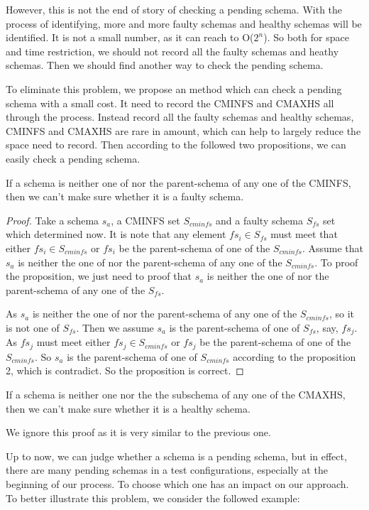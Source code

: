 \documentclass[10pt,journal,cspaper,compsoc]{IEEEtran}
\begin{document}
However, this is not the end of story of checking a pending schema. With the process of identifying, more and more faulty schemas and healthy schemas will be identified. It is not a small number, as it can reach to O($2^n$). So both for space and time restriction, we should not record all the faulty schemas and heathy schemas. Then we should find another way to check the pending schema.

To eliminate this problem, we propose an method which can check a pending schema with a small cost. It need to record the CMINFS and CMAXHS all through the process. Instead record all the faulty schemas and healthy schemas, CMINFS and CMAXHS are rare in amount, which can help to largely reduce the space need to record. Then according to the followed two propositions, we can easily check a pending schema.

\begin{proposition}
If a schema is neither one of nor the parent-schema of any one of the CMINFS, then we can't make sure whether it is a faulty schema.
\end{proposition}
\begin{proof}
Take a schema $s_a$, a CMINFS set $S_{cminfs}$ and a faulty schema $S_{fs}$ set which determined now. It is note that any element $fs_i \in S_{fs}$ must meet that either $fs_i \in S_{cminfs}$ or $fs_i$ be the parent-schema of one of the $S_{cminfs}$. Assume that $s_a$ is neither the one of nor the parent-schema of any one of the $S_{cminfs}$. To proof the proposition, we just need to proof that $s_a$ is neither the one of nor the parent-schema of any one of the $S_{fs}$.

As $s_a$ is neither the one of nor the parent-schema of any one of the $S_{cminfs}$, so it is not one of $S_{fs}$. Then we assume $s_a$ is the parent-schema of one of $S_{fs}$, say, $fs_j$. As $fs_j$ must meet either $fs_j \in S_{cminfs}$ or $fs_j$ be the parent-schema of one of the $S_{cminfs}$. So $s_a$ is the parent-schema of one of $S_{cminfs}$ according to the proposition 2, which is contradict. So the proposition is correct.
\end{proof}

\begin{proposition}
If a schema is neither one nor the the subschema of any one of the CMAXHS, then we can't make sure whether it is a healthy schema.
\end{proposition}
We ignore this proof as it is very similar to the previous one.

Up to now, we can judge whether a schema is a pending schema, but in effect, there are many pending schemas in a test configurations, especially at the beginning of our process. To choose which one has an impact on our approach. To better illustrate this problem, we consider the followed example:
\end{document}
